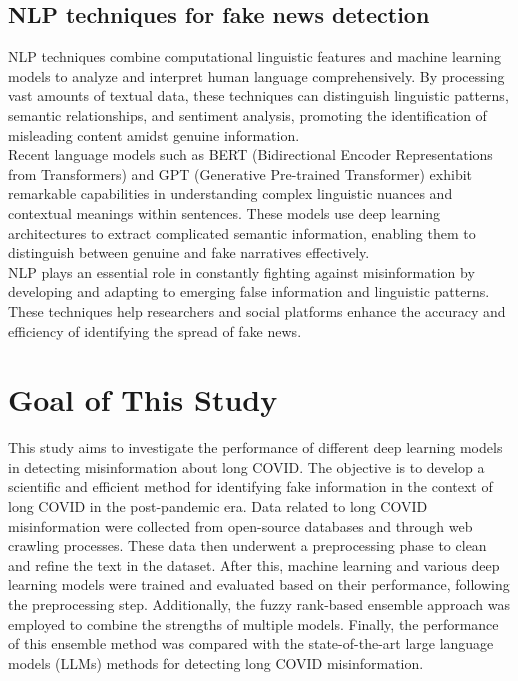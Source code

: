 \subsection{NLP techniques for fake news detection}
NLP techniques combine computational linguistic features and machine learning models to analyze and interpret human language comprehensively. By processing vast amounts of textual data, these techniques can distinguish linguistic patterns, semantic relationships, and sentiment analysis, promoting the identification of misleading content amidst genuine information.\\

Recent language models such as BERT (Bidirectional Encoder Representations from Transformers) and GPT (Generative Pre-trained Transformer) exhibit remarkable capabilities in understanding complex linguistic nuances and contextual meanings within sentences. These models use deep learning architectures to extract complicated semantic information, enabling them to distinguish between genuine and fake narratives effectively.\\

NLP plays an essential role in constantly fighting against misinformation by developing and adapting to emerging false information and linguistic patterns. These techniques help researchers and social platforms enhance the accuracy and efficiency of identifying the spread of fake news.

\section{Goal of This Study}
This study aims to investigate the performance of different deep learning models in detecting misinformation about long COVID. The objective is to develop a scientific and efficient method for identifying fake information in the context of long COVID in the post-pandemic era. Data related to long COVID misinformation were collected from open-source databases and through web crawling processes. These data then underwent a preprocessing phase to clean and refine the text in the dataset. After this, machine learning and various deep learning models were trained and evaluated based on their performance, following the preprocessing step. Additionally, the fuzzy rank-based ensemble approach was employed to combine the strengths of multiple models. Finally, the performance of this ensemble method was compared with the state-of-the-art large language models (LLMs) methods for detecting long COVID misinformation.

